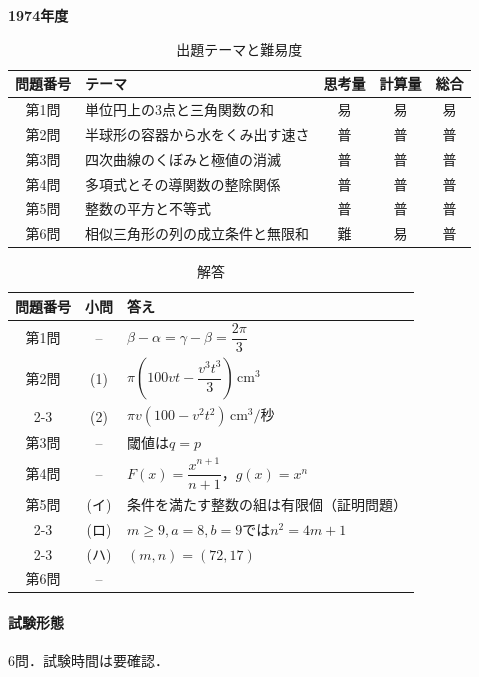 \documentclass[../../main.tex]{subfiles}
\begin{document}
\begin{center}
  {\fontsize{48pt}{58pt}\selectfont \textbf{1974}\normalsize\textbf{年度}}
\end{center}

\begin{table}[htb]
  \centering
  \caption{出題テーマと難易度}
  \begin{tabular}{|c|p{6.2cm}|c|c|c|}
    \hline
    \textbf{問題番号} & \textbf{テーマ} & \textbf{思考量} & \textbf{計算量} & \textbf{総合} \\
    \hline
    第1問 & 単位円上の3点と三角関数の和 & 易 & 易 & 易 \\
    \hline
    第2問 & 半球形の容器から水をくみ出す速さ & 普 & 普 & 普 \\
    \hline
    第3問 & 四次曲線のくぼみと極値の消滅 & 普 & 普 & 普 \\
    \hline
    第4問 & 多項式とその導関数の整除関係 & 普 & 普 & 普 \\
    \hline
    第5問 & 整数の平方と不等式 & 普 & 普 & 普 \\
    \hline
    第6問 & 相似三角形の列の成立条件と無限和 & 難 & 易 & 普 \\
    \hline
  \end{tabular}
\end{table}

\begin{table}[htb]
  \centering
  \caption{解答}
  \renewcommand{\arraystretch}{1.4}
  \begin{tabular}{|c|c|p{9cm}|}
    \hline
    \textbf{問題番号} & \textbf{小問} & \textbf{答え} \\
    \hline
    第1問 & -- & $\beta-\alpha=\gamma-\beta=\dfrac{2\pi}{3}$ \\
    \hline
    第2問 & (1) & $\pi\left(100vt-\dfrac{v^3t^3}{3}\right)\,\mathrm{cm^3}$ \\
    \cline{2-3}
    & (2) & $\pi v(100-v^2t^2)\,\mathrm{cm^3/秒}$ \\
    \hline
    第3問 & -- & 閾値は$q=p$ \\
    \hline
    第4問 & -- & $F(x)=\dfrac{x^{n+1}}{n+1}$，$g(x)=x^n$ \\
    \hline
    第5問 & (イ) & 条件を満たす整数の組は有限個（証明問題） \\
    \cline{2-3}
    & (ロ) & $m\ge9,a=8,b=9$では$n^2=4m+1$ \\
    \cline{2-3}
    & (ハ) & $(m,n)=(72,17)$ \\
    \hline
    第6問 & -- &  \\
    \hline
  \end{tabular}
\end{table}

\paragraph{試験形態}
6問．試験時間は要確認．
\end{document}
